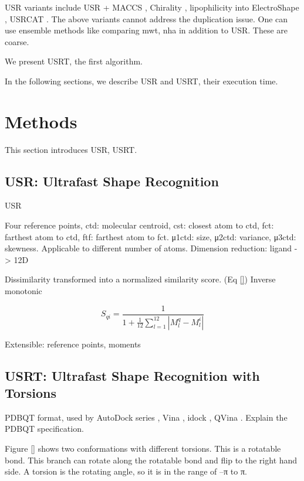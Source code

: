 \documentclass[twocolumn]{svjour3}          %
\begin{document}
USR variants include USR + MACCS \cite{1333}, Chirality \cite{1334,1335}, lipophilicity into ElectroShape \cite{1337,1338}, USRCAT \cite{1331}. The above variants cannot address the duplication issue. One can use ensemble methods like comparing mwt, nha in addition to USR. These are coarse.

We present USRT, the first algorithm.

In the following sections, we describe USR and USRT, their execution time.

\section{Methods}
\label{sec:methods}

This section introduces USR, USRT.

\subsection{USR: Ultrafast Shape Recognition}
\label{sec:usr}

USR \cite{1379}

Four reference points, ctd: molecular centroid, cst: closest atom to ctd, fct: farthest atom to ctd, ftf: farthest atom to fct. μ1ctd: size, μ2ctd: variance, μ3ctd: skewness. Applicable to different number of atoms. Dimension reduction: ligand -> 12D

Dissimilarity transformed into a normalized similarity score. (Eq \ref{}) Inverse monotonic

\begin{equation}
S_{qi}=\frac{1}{1+\frac{1}{12}\sum_{l=1}^{12}|M_l^q-M_l^i|}
\label{eqn:usr}
\end{equation}

Extensible: reference points, moments


\subsection{USRT: Ultrafast Shape Recognition with Torsions}
\label{sec:usrt}

PDBQT format, used by AutoDock series \cite{597,596}, Vina \cite{595}, idock \cite{1153}, QVina \cite{1193}. Explain the PDBQT specification.

Figure \ref{} shows two conformations with different torsions. This is a rotatable bond. This branch can rotate along the rotatable bond and flip to the right hand side. A torsion is the rotating angle, so it is in the range of –π to π. 
\end{document}
